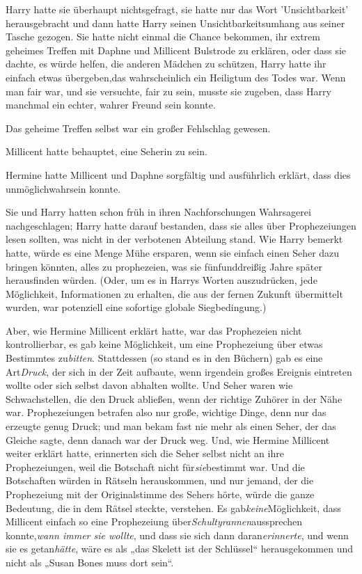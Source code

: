 {Harry hatte sie überhaupt nichtsgefragt, sie hatte nur das Wort 'Unsichtbarkeit' herausgebracht und dann hatte Harry seinen Unsichtbarkeitsumhang aus seiner Tasche gezogen. Sie hatte nicht einmal die Chance bekommen, ihr extrem geheimes Treffen mit Daphne und Millicent Bulstrode zu erklären, oder dass sie dachte, es würde helfen, die anderen Mädchen zu schützen, Harry hatte ihr einfach etwas übergeben,das wahrscheinlich ein Heiligtum des Todes war. Wenn man fair war, und sie versuchte, fair zu sein, musste sie zugeben, dass Harry manchmal ein echter, wahrer Freund sein konnte.

Das geheime Treffen selbst war ein großer Fehlschlag gewesen.

Millicent hatte behauptet, eine Seherin zu sein.

Hermine hatte Millicent und Daphne sorgfältig und ausführlich erklärt, dass dies unmöglichwahrsein konnte.

Sie und Harry hatten schon früh in ihren Nachforschungen Wahrsagerei nachgeschlagen; Harry hatte darauf bestanden, dass sie alles über Prophezeiungen lesen sollten, was nicht in der verbotenen Abteilung stand. Wie Harry bemerkt hatte, würde es eine Menge Mühe ersparen, wenn sie einfach einen Seher dazu bringen könnten, alles zu prophezeien, was sie fünfunddreißig Jahre später herausfinden würden. (Oder, um es in Harrys Worten auszudrücken, jede Möglichkeit, Informationen zu erhalten, die aus der fernen Zukunft übermittelt wurden, war potenziell eine sofortige globale Siegbedingung.)

Aber, wie Hermine Millicent erklärt hatte, war das Prophezeien nicht kontrollierbar, es gab keine Möglichkeit, um eine Prophezeiung über etwas Bestimmtes zu\emph{bitten}. Stattdessen (so stand es in den Büchern) gab es eine Art\emph{Druck}, der sich in der Zeit aufbaute, wenn irgendein großes Ereignis eintreten wollte oder sich selbst davon abhalten wollte. Und Seher waren wie Schwachstellen, die den Druck abließen, wenn der richtige Zuhörer in der Nähe war. Prophezeiungen betrafen also nur große, wichtige Dinge, denn nur das erzeugte genug Druck; und man bekam fast nie mehr als einen Seher, der das Gleiche sagte, denn danach war der Druck weg. Und, wie Hermine Millicent weiter erklärt hatte, erinnerten sich die Seher selbst nicht an ihre Prophezeiungen, weil die Botschaft nicht für\emph{sie}bestimmt war. Und die Botschaften würden in Rätseln herauskommen, und nur jemand, der die Prophezeiung mit der Originalstimme des Sehers hörte, würde die ganze Bedeutung, die in dem Rätsel steckte, verstehen. Es gab\emph{keine}Möglichkeit, dass Millicent einfach so eine Prophezeiung über\emph{Schultyrannen}aussprechen konnte,\emph{wann immer sie wollte}, und dass sie sich dann daran\emph{erinnerte}, und wenn sie es getan\emph{hätte}, wäre es als „das Skelett ist der Schlüssel“ herausgekommen und nicht als „Susan Bones muss dort sein“.

}
